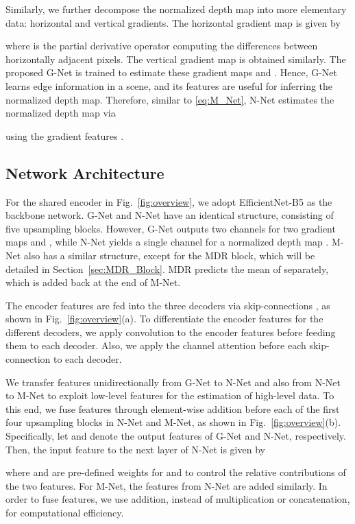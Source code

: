 \documentclass[runningheads]{llncs}
\begin{document}
Similarly, we further decompose the normalized depth map  into more elementary data: horizontal and vertical gradients. The horizontal gradient map  is given by

where  is the partial derivative operator computing the differences between horizontally adjacent pixels. The vertical gradient map  is obtained similarly. The proposed G-Net is trained to estimate these gradient maps  and . Hence, G-Net learns edge information in a scene, and its features  are useful for inferring the normalized depth map. Therefore, similar to \eqref{eq:M_Net}, N-Net estimates the normalized depth map via

using the gradient features .


\subsection{Network Architecture}
For the shared encoder in Fig.~\ref{fig:overview}, we adopt EfficientNet-B5 \cite{tan2019efficientnet} as the backbone network. G-Net and N-Net have an identical structure, consisting of five upsampling blocks. However, G-Net outputs two channels for two gradient maps  and , while N-Net yields a single channel for a normalized depth map . M-Net also has a similar structure, except for the MDR block, which will be detailed in Section~\ref{sec:MDR_Block}. MDR predicts the mean  of  separately, which is added back at the end of M-Net.

The encoder features are fed into the three decoders via skip-connections \cite{he2016deep}, as shown in Fig.~\ref{fig:overview}(a). To differentiate the encoder features for the different decoders, we apply  convolution to the encoder features before feeding them to each decoder. Also, we apply the channel attention \cite{hu2018squeeze} before each skip-connection to each decoder.

We transfer features unidirectionally from G-Net to N-Net and also from N-Net to M-Net to exploit low-level features for the estimation of high-level data. To this end, we fuse features through element-wise addition before each of the first four upsampling blocks in N-Net and M-Net, as shown in Fig.~\ref{fig:overview}(b). Specifically, let  and  denote the output features of G-Net and N-Net, respectively. Then, the input feature  to the next layer of N-Net is given by

where  and  are pre-defined weights for  and  to control the relative contributions of the two features. For M-Net, the features from N-Net are added similarly. In order to fuse features, we use addition, instead of multiplication or concatenation, for computational efficiency.
\end{document}
